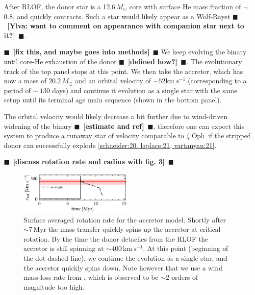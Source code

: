 \documentclass[twocolumn,twocolappendix,trackchanges]{aastex63}
\newcommand{\kms}{{\mathrm{km\ s^{-1}}}}
\newcommand{\zoph}{$\zeta$ Oph}
\newcommand{\todo}[1]{{\large $\blacksquare$~\textbf{\color{red}[#1]}}~$\blacksquare$}
\begin{document}
After RLOF, the donor star is a 12.6$\,M_\odot$ core with surface He
mass fraction of $\sim$0.8, and quickly contracts. Such a star would
likely appear as a Wolf-Rayet \todo{Ylva: want to comment on
  appearance with companion star next to it?}.

\todo{fix this, and maybe goes into methods}
We keep evolving the
binary until core-He exhaustion of the donor \todo{defined how?}. The
evolutionary track of the top panel stops at this point.  We then take
the accretor, which has now a mass of $20.2\,M_\odot$ and an orbital
velocity of $\sim 52\kms$ (corresponding to a period of $\sim\,130$
days) and continue it evolution as a single star
with the same setup until its terminal age main sequence (shown in the
bottom panel).

The orbital velocity would likely decrease a bit further due to
wind-driven widening of the binary \todo{estimate and ref}, therefore
one can expect this system to produce a runaway star of velocity
comparable to \zoph\ if the stripped donor can successfully explode
\ref{schneider:20, laplace:21, vartanyan:21}.

\todo{discuss rotation rate and radius with fig. 3}



\begin{figure}[htbp]
  \includegraphics[width=0.5\textwidth]{zeta_rot}
  \caption{Surface averaged rotation rate for the accretor
    model. Shortly after $\sim$7\,Myr the mass transfer quickly spins
    up the accretor at critical rotation. By the time the donor
    detaches from the RLOF the accretor is still spinning at
    $\sim$$400\,\kms$. At this point (beginning of the dot-dashed line), we continue the evolution as a single star, and the accretor quickly spins down. Note however that we use a wind mass-loss rate from \cite{vink:01}, which is observed to be
    $\sim$2 orders of magnitude too high.}
  \label{fig:rot}
\end{figure}


\end{document}
